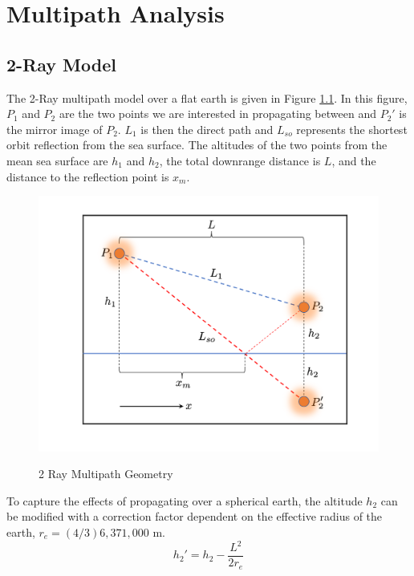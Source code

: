 \chapter{Multipath Analysis}

\section{2-Ray Model}
The 2-Ray multipath model over a flat earth is given in Figure \ref{mp_fig:1}. In this figure, $P_1$ and $P_2$ are the two points we are interested in propagating between and $P_2'$ is the mirror image of $P_2$. $L_1$ is then the direct path and $L_{so}$ represents the shortest orbit reflection from the sea surface. The altitudes of the two points from the mean sea surface are $h_1$ and $h_2$, the total downrange distance is $L$, and the distance to the reflection point is $x_m$.

\begin{figure}[H]
  \begin{center}
\includegraphics[width=5in]{../media/analysis/multipath_2_ray.png}
  \end{center}
  \renewcommand{\baselinestretch}{1} \small\normalsize
  \begin{quote}
    \caption[2 Ray Multipath Geometry]{ 2 Ray Multipath Geometry\label{mp_fig:1}}
  \end{quote}
\end{figure}
\renewcommand{\baselinestretch}{2} \small\normalsize

To capture the effects of propagating over a spherical earth, the altitude $h_2$ can be modified with a correction factor \cite{blake_radar} dependent on the effective radius of the earth, $r_e = (4/3) 6,371,000$ m.
\begin{equation}
h_2' = h_2 - \frac{L^2}{2r_e}
\label{mp_eq:0}
\end{equation}

